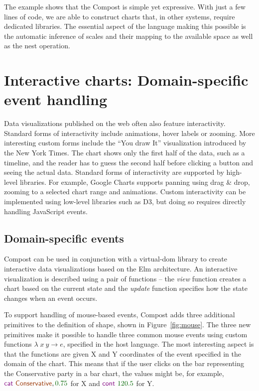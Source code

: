 \documentclass{jfp}
\newcommand{\num}[1]{\textcolor{numclr}{#1}}
\newcommand{\strf}[1]{\textnormal{\textcolor{strclr}{\sffamily #1}}}
\newcommand{\kvd}[1]{\textnormal{\textcolor{kvdclr}{\sffamily #1}}}
\begin{document}
The example shows that the Compost is simple yet expressive. With just
a few lines of code, we are able to construct charts that, in other systems, require dedicated
libraries. The essential aspect of the language making this possible is the automatic inference
of scales and their mapping to the available space as well as the \kvd{nest} operation.


\section{Interactive charts: Domain-specific event handling}
Data visualizations published on the web often also feature interactivity. Standard forms of
interactivity include animations, hover labels or zooming. More interesting custom forms
include the ``You draw It'' visualization introduced by the New York Times. %
The chart shows only the first half of the data, such as a timeline, and the reader has to
guess the second half before clicking a button and seeing the actual data. Standard forms of
interactivity are supported by high-level libraries. For example, Google Charts supports panning
using drag \& drop, zooming to a selected chart range and animations. Custom interactivity can be
implemented using low-level libraries such as D3, but doing so requires directly handling
JavaScript events.

\subsection{Domain-specific events}
Compost can be used in conjunction with a virtual-dom library to create interactive data
visualizations based on the Elm architecture. An interactive visualization is described using
a pair of functions -- the \emph{view} function creates a chart based on the current state and
the \emph{update} function specifies how the state changes when an event occurs.

To support handling of mouse-based events, Compost adds three additional primitives to the definition
of shape, shown in Figure~\ref{fig:mouse}. The three new primitives make it possible to handle
three common mouse events using custom functions $\lambda \;x~y\rightarrow e$, specified in the
host language. The most interesting aspect is that the functions are given X and Y coordinates
of the event specified in the domain of the chart. This means that if the user clicks on the
bar representing the Conservative party in a bar chart, the values might be, for example,
$\kvd{cat}~\strf{Conservative},\num{0.75}$ for X and $\kvd{cont}~\num{120.5}$ for Y.
\end{document}
